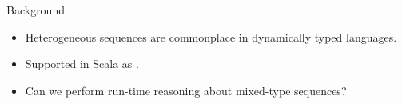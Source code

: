 \begin{frame}{Background}
  \begin{itemize}
  \item Heterogeneous sequences are commonplace in dynamically typed languages.
  \item Supported in Scala as .
  \item Can we perform run-time reasoning about mixed-type sequences?
  \end{itemize}
\end{frame}
